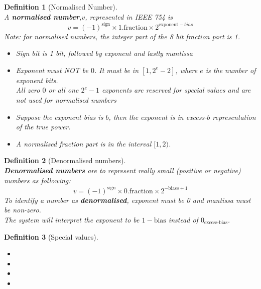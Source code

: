 \documentclass[12pt]{article}
\newtheorem{definition}{Definition}[section]
\theoremstyle{definition}
\begin{document}
\begin{definition}[Normalised Number]
\hfill\\\normalfont A \textbf{normalised number},$v$, represented in IEEE 754 is
\[
v = (-1)^\text{sign}\times 1.\text{fraction}\times 2^{\text{exponent}-bias}
\]
Note: for normalised numbers, the integer part of the 8 bit fraction part is 1.
\begin{itemize}
  \item Sign bit is 1 bit, followed by exponent and lastly mantissa
  \item Exponent must NOT be $0$. It must be in $[1,2^e-2]$, where $e$ is the number of exponent bits.\\ All zero $0$ or all one $2^e-1$ exponents are reserved for special values and are not used for normalised numbers
  \item Suppose the exponent bias is $b$, then the exponent is in excess-$b$ representation of the true power.
  \item A normalised fraction part is in the interval $[1,2)$.
\end{itemize}
\end{definition}
\begin{definition}[Denormalised numbers]
\hfill\\\normalfont \textbf{Denormalised numbers} are to represent really small (positive or negative) numbers as following:
\[
v=(-1)^\text{sign}\times 0.\text{fraction}\times 2^{-\text{bias}s+1} 
\]
To identify a number as \textbf{denormalised}, exponent must be 0 and mantissa must be non-zero.\\
The system will interpret the exponent to be $1-\text{bias}$ instead of $0_\text{excess-bias}$.
\end{definition}
\begin{definition}[Special values]
\hfill\\\normalfont
\begin{itemize}
  \item {}
  \item \makebox[1.5cm]{$+\infty$:\hfill}
  \item \makebox[1.5cm]{$-\infty$:\hfill}
  \item {} 
\end{itemize}
\end{definition}
\end{document}
